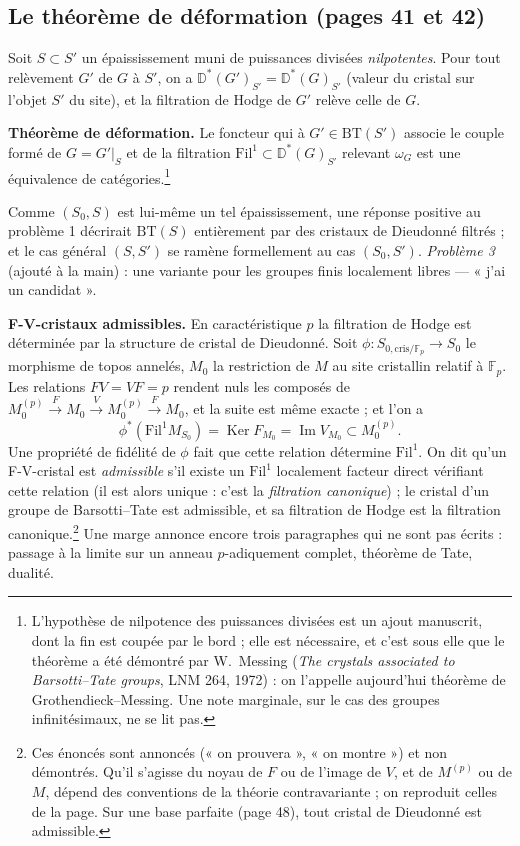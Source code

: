 \documentclass[11pt,a4paper]{article}
\begin{document}
\subsection*{Le théorème de déformation (pages 41 et 42)}

Soit $S \subset S'$ un épaississement muni de puissances divisées
\emph{nilpotentes}. Pour tout relèvement $G'$ de $G$ à $S'$, on a
$\mathbb{D}^*(G')_{S'} = \mathbb{D}^*(G)_{S'}$ (valeur du cristal sur l'objet
$S'$ du site), et la filtration de Hodge de $G'$ relève celle de $G$.

\textbf{Théorème de déformation.} Le foncteur qui à $G' \in \mathrm{BT}(S')$
associe le couple formé de $G = G'|_S$ et de la filtration
$\mathrm{Fil}^1 \subset \mathbb{D}^*(G)_{S'}$ relevant $\omega_G$ est une
équivalence de catégories.\footnote{L'hypothèse de nilpotence des puissances
divisées est un ajout manuscrit, dont la fin est coupée par le bord ; elle est
nécessaire, et c'est sous elle que le théorème a été démontré par
W.~Messing (\emph{The crystals associated to Barsotti--Tate groups},
LNM 264, 1972) : on l'appelle aujourd'hui théorème de Grothendieck--Messing.
Une note marginale, sur le cas des groupes infinitésimaux, ne se lit pas.}

Comme $(S_0, S)$ est lui-même un tel épaississement, une réponse positive au
problème 1 décrirait $\mathrm{BT}(S)$ entièrement par des cristaux de
Dieudonné filtrés ; et le cas général $(S, S')$ se ramène formellement au
cas $(S_0, S')$. \emph{Problème 3} (ajouté à la main) : une variante pour
les groupes finis localement libres — « j'ai un candidat ».

\textbf{F-V-cristaux admissibles.} En caractéristique $p$ la filtration de
Hodge est déterminée par la structure de cristal de Dieudonné. Soit
$\phi : S_{0,\mathrm{cris}/\mathbb{F}_p} \to S_0$ le morphisme de topos annelés,
$M_0$ la restriction de $M$ au site cristallin relatif à $\mathbb{F}_p$. Les
relations $FV = VF = p$ rendent nuls les composés de
$M_0^{(p)} \xrightarrow{F} M_0 \xrightarrow{V} M_0^{(p)} \xrightarrow{F} M_0$, et
la suite est même exacte ; et l'on a
\[
  \phi^*(\mathrm{Fil}^1 M_{S_0}) = \operatorname{Ker} F_{M_0}
  = \operatorname{Im} V_{M_0} \subset M_0^{(p)} .
\]
Une propriété de fidélité de $\phi$ fait que cette relation détermine
$\mathrm{Fil}^1$. On dit qu'un F-V-cristal est \emph{admissible} s'il existe un
$\mathrm{Fil}^1$ localement facteur direct vérifiant cette relation (il est
alors unique : c'est la \emph{filtration canonique}) ; le cristal d'un groupe
de Barsotti--Tate est admissible, et sa filtration de Hodge est la
filtration canonique.\footnote{Ces énoncés sont annoncés (« on prouvera »,
« on montre ») et non démontrés. Qu'il s'agisse du noyau de $F$ ou de l'image
de $V$, et de $M^{(p)}$ ou de $M$, dépend des conventions de la théorie
contravariante ; on reproduit celles de la page. Sur une base parfaite
(page 48), tout cristal de Dieudonné est admissible.} Une marge annonce
encore trois paragraphes qui ne sont pas écrits : passage à la limite sur un
anneau $p$-adiquement complet, théorème de Tate, dualité.
\end{document}
